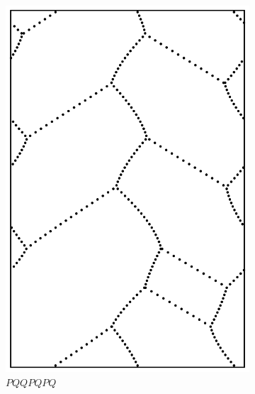 \documentclass[12pt,twoside]{reedthesis}
\theoremstyle{definition}
\begin{document}
\begin{figure}[h]
\begin{subfigure}[t]{0.24\textwidth}
    \includegraphics[width=\textwidth]{figures/string_cheese_appendix/pqqpqpq.pdf}
    \caption*{$PQQPQPQ$}
    \vspace{5mm}
  \end{subfigure}
  \hfill
  \begin{subfigure}[t]{0.24\textwidth}

\end{subfigure}
\end{figure}
\end{document}
